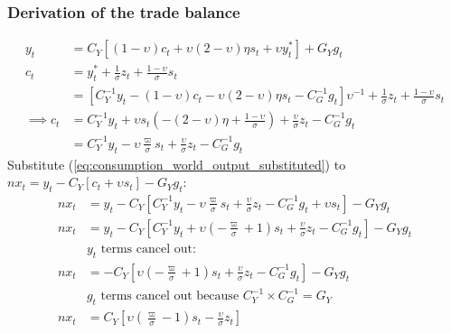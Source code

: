 \subsubsection*{Derivation of the trade balance}
\begin{align}\label{eq:appendix_trade_balance_derivation_beginning}
    y_t &= C_Y\left[(1-\upsilon)c_t + \upsilon (2-\upsilon)\eta s_t + \upsilon y^*_t\right] + G_Y g_t\\
    c_t &= y_t^* + \frac{1}{\sigma}z_t + \frac{1-\upsilon}{\sigma}s_t\\
    &= \left[C_Y^{-1} y_t -(1-\upsilon)c_t - \upsilon(2-\upsilon)\eta s_t - C^{-1}_G g_t \right]\upsilon^{-1} + \frac{1}{\sigma}z_t + \frac{1-\upsilon}{\sigma}s_t\\
    \implies c_t &= C_Y^{-1} y_t + \upsilon s_t \left( -(2-\upsilon)\eta + \frac{1-\upsilon}{\sigma}\right) + \frac{\upsilon}{\sigma}z_t - C_G^{-1} g_t \\
     &= C_Y^{-1} y_t - \upsilon \frac{\varpi}{\sigma} s_t + \frac{\upsilon}{\sigma}z_t - C_G^{-1} g_t \label{eq:consumption_world_output_substituted}
\end{align}
Substitute (\ref{eq:consumption_world_output_substituted}) to $nx_t=y_t - C_Y[c_t + \upsilon s_t] - G_Y g_t$:
\begin{align}
    nx_t&=y_t - C_Y\left[C_Y^{-1} y_t - \upsilon \frac{\varpi}{\sigma} s_t + \frac{\upsilon}{\sigma}z_t - C_G^{-1} g_t + \upsilon s_t \right] - G_Y g_t \\
    nx_t&=y_t - C_Y\left[C_Y^{-1} y_t + \upsilon \left(-\frac{\varpi}{\sigma} + 1\right) s_t + \frac{\upsilon}{\sigma}z_t - C_G^{-1} g_t \right] - G_Y g_t \\
    &\text{$y_t$ terms cancel out:} \nonumber\\
    nx_t&=-C_Y\left[\upsilon \left(-\frac{\varpi}{\sigma} + 1\right) s_t + \frac{\upsilon}{\sigma}z_t - C_G^{-1} g_t \right] - G_Y g_t \\
    &\text{$g_t$ terms cancel out because $C_Y^{-1}\times C_G^{-1} = G_Y$} \nonumber\\
    nx_t&=C_Y\left[\upsilon \left(\frac{\varpi}{\sigma} - 1\right) s_t - \frac{\upsilon}{\sigma}z_t \right] \label{eq:appendix_trade_balance_derivation_end}
\end{align}
\newpage